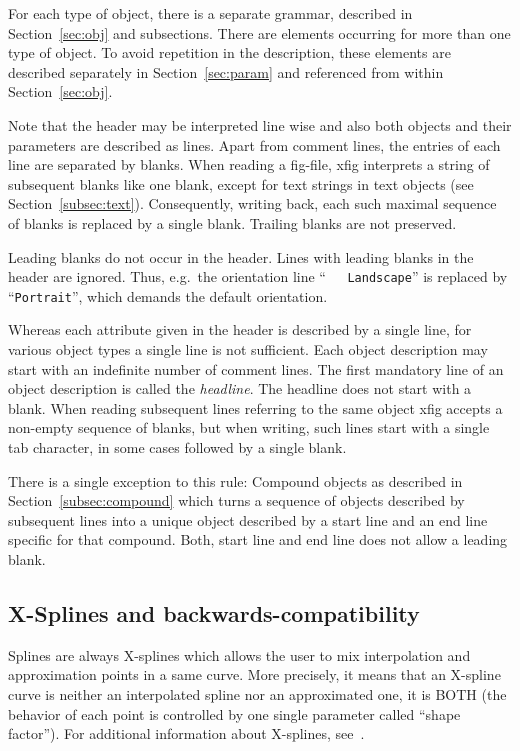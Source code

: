 \documentclass[10pt, a4paper, english]{article}%
\begin{document}
For each type of object, there is a separate grammar, 
described in Section~\ref{sec:obj} and subsections. 
There are elements occurring for more than one type of object. 
To avoid repetition in the description, 
these elements are described separately in Section~\ref{sec:param} 
and referenced from within Section~\ref{sec:obj}. 

Note that the header may be interpreted line wise 
and also both objects and their parameters are described as lines. 
Apart from comment lines, the entries of each line are separated by blanks. 
When reading a fig-file, 
xfig interprets a string of subsequent blanks like one blank, 
except for text strings in text objects (see Section~\ref{subsec:text}). 
Consequently, writing back, each such maximal sequence of blanks 
is replaced by a single blank. 
Trailing blanks are not preserved. 

Leading blanks do not occur in the header. 
Lines with leading blanks in the header are ignored. 
Thus, e.g.~the orientation line 
``\texttt{\ \ \ Landscape}'' is replaced by ``\texttt{Portrait}'', 
which demands the default orientation. 

Whereas each attribute given in the header is described by a single line, 
for various object types a single line is not sufficient. 
Each object description may start with an indefinite number of comment lines. 
The first mandatory line of an object description is called the \emph{headline}. 
The headline does not start with a blank. 
When reading subsequent lines referring to the same object 
xfig accepts a non-empty sequence of blanks, 
but when writing, such lines start with a single tab character, 
in some cases followed by a single blank. 

There is a single exception to this rule: 
Compound objects as described in Section~\ref{subsec:compound} 
which turns a sequence of objects described by subsequent lines 
into a unique object described by a 
start line and an end line specific for that compound. 
Both, start line and end line does not allow a leading blank. 


\subsection{X-Splines and backwards-compatibility}

Splines are always X-splines 
which allows the user to mix interpolation and approximation 
points in a same curve. 
More precisely, it means that an X-spline curve 
is neither an interpolated spline nor an approximated one, 
it is BOTH (the behavior of each point 
is controlled by one single parameter called ``shape factor''). 
For additional information about X-splines, see~\cite{XSpline}. 
\end{document}
